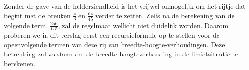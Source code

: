 \documentclass{article}
\begin{document}
Zonder de gave van de helderziendheid is het vrijwel onmogelijk om het rijtje dat begint met de breuken $\frac{4}{3}$ en $\frac{64}{45}$ verder te zetten. Zelfs na de berekening van de volgende term, $\frac{256}{175}$, zal de regelmaat wellicht niet duidelijk worden. Daarom proberen we in dit verslag eerst een recursieformule op te stellen voor de opeenvolgende termen van deze rij van breedte-hoogte-verhoudingen. Deze betrekking zal volstaan om de breedte-hoogteverhouding in de limietsituatie te berekenen.
\end{document}
